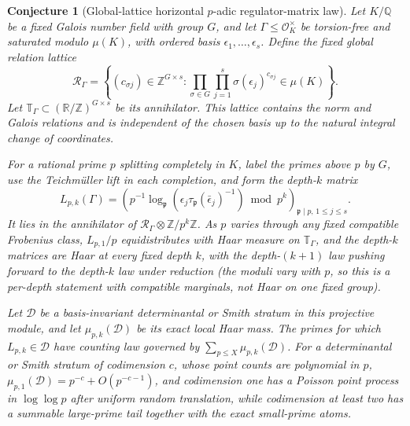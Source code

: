 \documentclass[11pt]{article}
\newtheorem{conjecture}{Conjecture}
\theoremstyle{definition}
\newcommand{\Z}{\mathbb Z}
\newcommand{\Q}{\mathbb Q}
\newcommand{\R}{\mathbb R}
\providecommand{\Z}{\mathbb Z}
\providecommand{\Q}{\mathbb Q}
\providecommand{\R}{\mathbb R}
\begin{document}
\begin{conjecture}[Global-lattice horizontal $p$-adic regulator-matrix law]\label{s14}
Let $K/\Q$ be a fixed Galois number field with group $G$, and let
$\Gamma\le\mathcal O_K^\times$ be torsion-free and saturated modulo $\mu(K)$, with ordered basis
$\epsilon_1,\ldots,\epsilon_s$.  Define the fixed global relation lattice
\[
 \mathcal R_\Gamma=
 \left\{(c_{\sigma j})\in\Z^{G\times s}:
   \prod_{\sigma\in G}\prod_{j=1}^s
   \sigma(\epsilon_j)^{c_{\sigma j}}\in\mu(K)\right\}.
\]
Let $\mathbb T_\Gamma\subset(\R/\Z)^{G\times s}$ be its annihilator.  This lattice
contains the norm and Galois relations and is independent of the chosen basis up to the
natural integral change of coordinates.

For a rational prime $p$ splitting completely in $K$, label the primes above $p$ by
$G$, use the Teichm\"uller lift in each completion, and form the depth-$k$ matrix
\[
 L_{p,k}(\Gamma)=
 \left(p^{-1}\log_{\mathfrak p}
   (\epsilon_j\tau_{\mathfrak p}(\bar\epsilon_j)^{-1})
   \bmod p^k\right)_{\mathfrak p\mid p,\,1\le j\le s}.
\]
It lies in the annihilator of
$\mathcal R_\Gamma\otimes\Z/p^k\Z$.  As $p$ varies through any fixed compatible
Frobenius class, $L_{p,1}/p$ equidistributes with Haar measure on
$\mathbb T_\Gamma$, and the depth-$k$ matrices are Haar at every fixed depth $k$, with the depth-$(k+1)$ law pushing forward to the depth-$k$ law under reduction (the moduli vary with $p$, so this is a per-depth statement with compatible marginals, not Haar on one fixed group).

Let $\mathcal D$ be a basis-invariant determinantal or Smith stratum in this projective
module, and let $\mu_{p,k}(\mathcal D)$ be its exact local Haar mass.  The primes for
which $L_{p,k}\in\mathcal D$ have counting law governed by
$\sum_{p\le X}\mu_{p,k}(\mathcal D)$.  For a determinantal or Smith stratum of codimension $c$, whose point counts are polynomial in $p$, $\mu_{p,1}(\mathcal D)=p^{-c}+O(p^{-c-1})$, and codimension one has a Poisson point process
in $\log\log p$ after uniform random translation, while codimension at least two has a
summable large-prime tail together with the exact small-prime atoms.
\end{conjecture}
\end{document}
